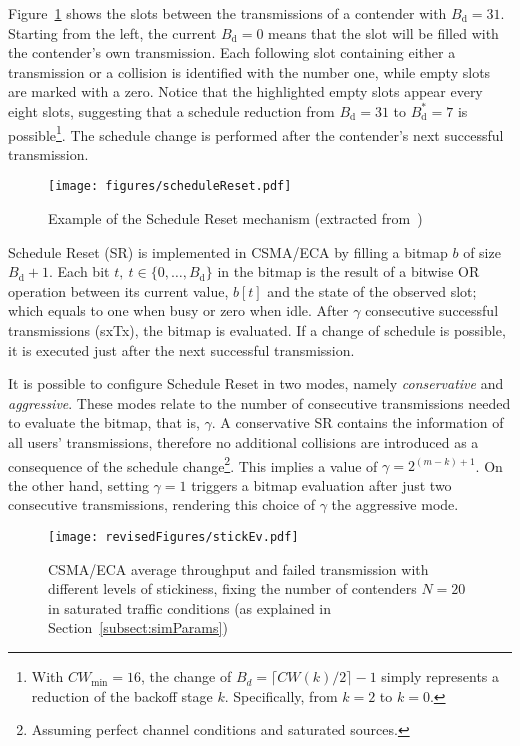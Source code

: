 \documentclass[a4paper]{article}
\begin{document}
Figure~\ref{fig:scheduleReset1} shows the slots between the transmissions of a contender with $B_{\text{d}}=31$. Starting from the left, the current $B_{\text{d}}=0$ means that the slot will be filled with the contender's own transmission. Each following slot containing either a transmission or a collision is identified with the number one, while empty slots are marked with a zero. Notice that the highlighted empty slots appear every eight slots, suggesting that a schedule reduction from $B_{\text{d}}=31$ to $B_{\text{d}}^{*}=7$ is possible\footnote{With $CW_{\min}=16$, the change of $B_{d}= \lceil CW(k)/2\rceil-1$ simply represents a reduction of the backoff stage $k$. Specifically, from $k=2$ to $k=0$.}. The schedule change is performed after the contender's next successful transmission. 

	\begin{figure}[t!]
	\centering
		\texttt{[image: figures/scheduleReset.pdf]}
		\caption{Example of the Schedule Reset mechanism (extracted from~\cite{sanabria2014high})}
		\label{fig:scheduleReset1}
	\end{figure}

Schedule Reset (SR) is implemented in CSMA/ECA by filling a bitmap $b$ of size $B_{\text{d}}+1$. Each bit $t,~t\in\{0,\ldots ,B_{\text{d}}\}$ in the bitmap is the result of a bitwise OR operation between its current value, $b[t]$ and the state of the observed slot; which equals to one when busy or zero when idle. After $\gamma$ consecutive successful transmissions (sxTx), the bitmap is evaluated. If a change of schedule is possible, it is executed just after the next successful transmission.

It is possible to configure Schedule Reset in two modes, namely \emph{conservative} and \emph{aggressive}. These modes relate to the number of consecutive transmissions needed to evaluate the bitmap, that is, $\gamma$. A conservative SR contains the information of all users' transmissions, therefore no additional collisions are introduced as a consequence of the schedule change\footnote{Assuming perfect channel conditions and saturated sources.}. This implies a value of $\gamma=2^{(m-k)+1}$. On the other hand, setting $\gamma=1$ triggers a bitmap evaluation after just two consecutive transmissions, rendering this choice of $\gamma$ the aggressive mode.

\begin{figure}[tb]
	\centering
		\texttt{[image: revisedFigures/stickEv.pdf]}
		\caption{CSMA/ECA average throughput and failed transmission with different levels of stickiness, fixing the number of contenders $N=20$ in saturated traffic conditions (as explained in Section~\ref{subsect:simParams})}
		\label{fig:stickEv-throughput-overallOnly}
	\end{figure}
\end{document}
